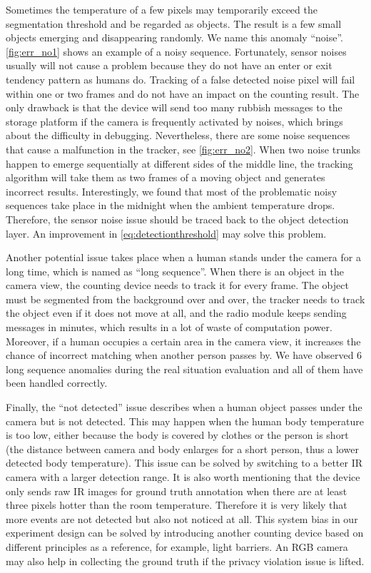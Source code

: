 Sometimes the temperature of a few pixels may temporarily exceed the segmentation threshold and be regarded as objects. The result is a few small objects emerging and disappearing randomly. We name this anomaly ``noise''. \autoref{fig:err_no1} shows an example of a noisy sequence. Fortunately, sensor noises usually will not cause a problem because they do not have an enter or exit tendency pattern as humans do. Tracking of a false detected noise pixel will fail within one or two frames and do not have an impact on the counting result. The only drawback is that the device will send too many rubbish messages to the storage platform if the camera is frequently activated by noises, which brings about the difficulty in debugging. Nevertheless, there are some noise sequences that cause a malfunction in the tracker, see \autoref{fig:err_no2}. When two noise trunks happen to emerge sequentially at different sides of the middle line, the tracking algorithm will take them as two frames of a moving object and generates incorrect results. Interestingly, we found that most of the problematic noisy sequences take place in the midnight when the ambient temperature drops. Therefore, the sensor noise issue should be traced back to the object detection layer. An improvement in \autoref{eq:detectionthreshold} may solve this problem.

Another potential issue takes place when a human stands under the camera for a long time, which is named as ``long sequence''. When there is an object in the camera view, the counting device needs to track it for every frame. The object must be segmented from the background over and over, the tracker needs to track the object even if it does not move at all, and the radio module keeps sending messages in minutes, which results in a lot of waste of computation power. Moreover, if a human occupies a certain area in the camera view, it increases the chance of incorrect matching when another person passes by. We have observed 6 long sequence anomalies during the real situation evaluation and all of them have been handled correctly.

Finally, the ``not detected'' issue describes when a human object passes under the camera but is not detected. This may happen when the human body temperature is too low, either because the body is covered by clothes or the person is short (the distance between camera and body enlarges for a short person, thus a lower detected body temperature). This issue can be solved by switching to a better IR camera with a larger detection range. It is also worth mentioning that the device only sends raw IR images for ground truth annotation when there are at least three pixels hotter than the room temperature. Therefore it is very likely that more events are not detected but also not noticed at all. This system bias in our experiment design can be solved by introducing another counting device based on different principles as a reference, for example, light barriers. An RGB camera may also help in collecting the ground truth if the privacy violation issue is lifted.
